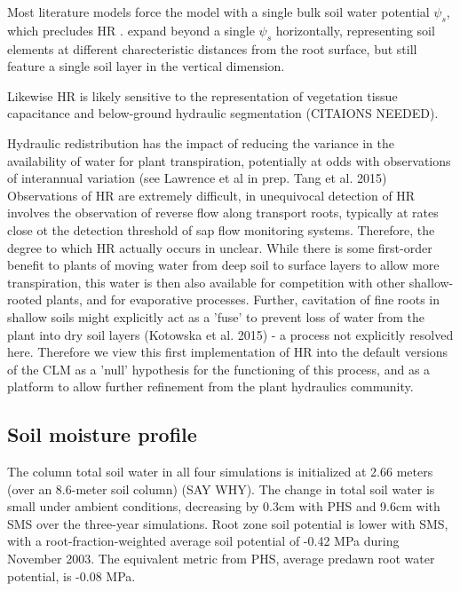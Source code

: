 \documentclass[draft,linenumbers]{agujournal}
\begin{document}
    Most literature models force the model with a single bulk soil water potential $\psi_s$, which precludes HR \citep{fisher2007,bonan2014,sperry2017}. \cite{christoffersen2016} expand beyond a single $\psi_s$ horizontally, representing soil elements at different charecteristic distances from the root surface,  but still feature a single soil layer in the vertical dimension.  
    
    Likewise HR is likely sensitive to the representation of vegetation tissue capacitance and below-ground hydraulic segmentation (CITAIONS NEEDED).
    
    Hydraulic redistribution has the impact of reducing the variance in the availability of water for plant transpiration, potentially at odds with observations of interannual variation (see Lawrence et al in prep. Tang et al. 2015) Observations of HR are extremely difficult, in unequivocal detection of HR involves the observation of reverse flow along transport roots, typically at rates close ot the detection threshold of sap flow monitoring systems. Therefore, the degree to which HR actually occurs in unclear. While there is some first-order benefit to plants of moving water from deep soil to surface layers to allow more transpiration, this water is then also available for competition with other shallow-rooted plants, and for evaporative processes. Further, cavitation of fine roots in shallow soils might explicitly act as a 'fuse' to prevent loss of water from the plant into dry soil layers (Kotowska et al. 2015) - a process not explicitly resolved here. Therefore we view this first implementation of HR into the default versions of the CLM as a 'null' hypothesis for the functioning of this process, and as a platform to allow further refinement from the plant hydraulics community. 
    

\subsection{Soil moisture profile}

    The column total soil water in all four simulations is initialized at 2.66 meters (over an 8.6-meter soil column) (SAY WHY). The change in total soil water is small under ambient conditions, decreasing by 0.3cm with PHS and 9.6cm with SMS over the three-year simulations. Root zone soil potential is lower with SMS, with a root-fraction-weighted average soil potential of -0.42 MPa during November 2003. The equivalent metric from PHS, average predawn root water potential, is -0.08 MPa. 
    
\end{document}
